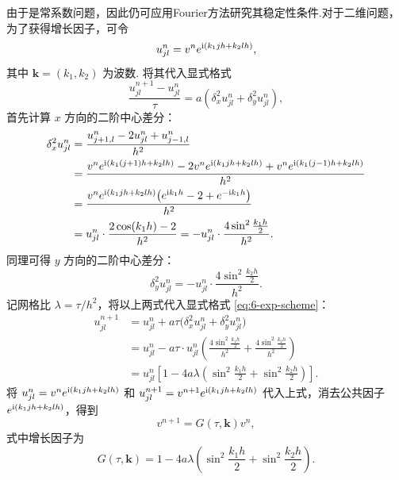 由于是常系数问题，因此仍可应用Fourier方法研究其稳定性条件.对于二维问题，为了获得增长因子，可令
\begin{equation*}
    u_{jl}^n = v^n e^{\mathrm{i}(k_1 jh + k_2 lh)},
\end{equation*}
其中 $\boldsymbol{k} = (k_1, k_2)$ 为波数. 将其代入显式格式
\begin{equation}\label{eq:6-exp-scheme}
    \frac{u_{jl}^{n+1} - u_{jl}^n}{\tau} = a\left(\delta_x^2 u_{jl}^n + \delta_y^2 u_{jl}^n\right),
\end{equation}
首先计算 $x$ 方向的二阶中心差分：
\begin{align*}
    \delta_x^2 u_{jl}^n
    &= \frac{u_{j+1,l}^n - 2u_{jl}^n + u_{j-1,l}^n}{h^2} \\
    &= \frac{v^n e^{\mathrm{i}(k_1 (j+1)h + k_2 lh)} - 2v^n e^{\mathrm{i}(k_1 jh + k_2 lh)} + v^n e^{\mathrm{i}(k_1 (j-1)h + k_2 lh)}}{h^2} \\
    &= \frac{v^n e^{\mathrm{i}(k_1 jh + k_2 lh)}\bigl(e^{\mathrm{i} k_1 h} - 2 + e^{-\mathrm{i} k_1 h}\bigr)}{h^2} \\
    &= u_{jl}^n \cdot \frac{2\cos(k_1 h) - 2}{h^2}
     = -u_{jl}^n \cdot \frac{4\sin^2 \frac{k_1 h}{2}}{h^2}.
\end{align*}
同理可得 $y$ 方向的二阶中心差分：
\begin{equation*}
    \delta_y^2 u_{jl}^n = -u_{jl}^n \cdot \frac{4\sin^2 \frac{k_2 h}{2}}{h^2}.
\end{equation*}
记网格比 $\lambda = \tau / h^2$，将以上两式代入显式格式 \eqref{eq:6-exp-scheme}：
\begin{align*}
    u_{jl}^{n+1}
    &= u_{jl}^n + a\tau\bigl(\delta_x^2 u_{jl}^n + \delta_y^2 u_{jl}^n\bigr) \\
    &= u_{jl}^n - a\tau \cdot u_{jl}^n \left(\frac{4\sin^2 \frac{k_1 h}{2}}{h^2} + \frac{4\sin^2 \frac{k_2 h}{2}}{h^2}\right) \\
    &= u_{jl}^n \left[1 - 4a\lambda\left(\sin^2 \frac{k_1 h}{2} + \sin^2 \frac{k_2 h}{2}\right)\right].
\end{align*}
将 $u_{jl}^n = v^n e^{\mathrm{i}(k_1 jh + k_2 lh)}$ 和 $u_{jl}^{n+1} = v^{n+1} e^{\mathrm{i}(k_1 jh + k_2 lh)}$ 代入上式，消去公共因子 $e^{\mathrm{i}(k_1 jh + k_2 lh)}$，得到
\begin{equation*}
    v^{n+1} = G(\tau, \boldsymbol{k}) v^n,
\end{equation*}
式中增长因子为
\begin{equation}\label{eq:6-growth}
    G(\tau, \boldsymbol{k}) = 1 - 4a\lambda \left(\sin^2 \frac{k_1 h}{2} + \sin^2 \frac{k_2 h}{2}\right).
\end{equation}

